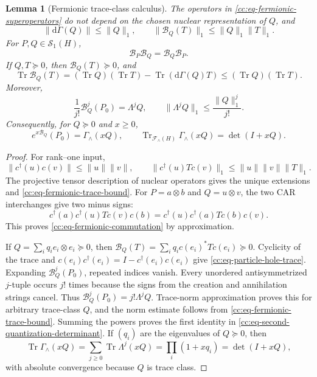 \documentclass[10pt,reqno]{amsart}
\theoremstyle{plain}
\newtheorem{lemma}[theorem]{Lemma}
\theoremstyle{definition}
\theoremstyle{remark}
\begin{document}
\begin{lemma}[Fermionic trace-class calculus]
\label{cc:lem-fermionic-calculus}
The operators in \eqref{cc:eq-fermionic-superoperators} do not depend on
the chosen nuclear representation of \(Q\), and
\begin{equation}
 \|\mathrm d\Gamma(Q)\|\leq\|Q\|_1,
 \qquad
 \|\mathcal B_Q(T)\|_1\leq\|Q\|_1\|T\|_1.
 \label{cc:eq-fermionic-trace-bound}
\end{equation}
For \(P,Q\in\mathcal S_1(H)\),
\begin{equation}
 \mathcal B_P\mathcal B_Q=\mathcal B_Q\mathcal B_P.
 \label{cc:eq-fermionic-commutation}
\end{equation}
If \(Q,T\succeq0\), then \(\mathcal B_Q(T)\succeq0\), and
\begin{equation}
 \operatorname{Tr}\mathcal B_Q(T)
 =(\operatorname{Tr}Q)(\operatorname{Tr}T)
  -\operatorname{Tr}(\mathrm d\Gamma(Q)T)
 \leq(\operatorname{Tr}Q)(\operatorname{Tr}T).
 \label{cc:eq-particle-hole-trace}
\end{equation}
Moreover,
\begin{equation}
 \frac1{j!}\mathcal B_Q^j(P_0)=\Lambda^jQ,
 \qquad
 \|\Lambda^jQ\|_1\leq\frac{\|Q\|_1^j}{j!}.
 \label{cc:eq-fermionic-powers}
\end{equation}
Consequently, for \(Q\succeq0\) and \(x\geq0\),
\begin{equation}
 e^{x\mathcal B_Q}(P_0)=\Gamma_{\wedge}(xQ),
 \qquad
 \operatorname{Tr}_{\mathcal F_{\wedge}(H)}\Gamma_{\wedge}(xQ)
 =\det(I+xQ).
 \label{cc:eq-second-quantization-determinant}
\end{equation}
\end{lemma}

\begin{proof}
For rank--one input,
\[
 \|c^{\dagger}(u)c(v)\|\leq\|u\|\|v\|,
 \qquad
 \|c^{\dagger}(u)Tc(v)\|_1
 \leq\|u\|\|v\|\|T\|_1.
\]
The projective tensor description of nuclear operators gives the unique
extensions and \eqref{cc:eq-fermionic-trace-bound}.  For
\(P=a\otimes b\) and \(Q=u\otimes v\), the two CAR interchanges give two
minus signs:
\[
 c^{\dagger}(a)c^{\dagger}(u)T c(v)c(b)
 =c^{\dagger}(u)c^{\dagger}(a)T c(b)c(v).
\]
This proves \eqref{cc:eq-fermionic-commutation} by approximation.

If \(Q=\sum_iq_i e_i\otimes e_i\succeq0\), then
\(
 \mathcal B_Q(T)=\sum_iq_i c(e_i)^*Tc(e_i)\succeq0
\).
Cyclicity of the trace and
\(c(e_i)c^{\dagger}(e_i)=I-c^{\dagger}(e_i)c(e_i)\) give
\eqref{cc:eq-particle-hole-trace}.  Expanding
\(\mathcal B_Q^j(P_0)\), repeated indices vanish.  Every unordered
antisymmetrized \(j\)-tuple occurs \(j!\) times because the signs from the
creation and annihilation strings cancel.  Thus
\(\mathcal B_Q^j(P_0)=j!\Lambda^jQ\).  Trace-norm approximation proves
this for arbitrary trace-class \(Q\), and the norm estimate follows from
\eqref{cc:eq-fermionic-trace-bound}.  Summing the powers proves the first
identity in \eqref{cc:eq-second-quantization-determinant}.  If
\((q_i)\) are the eigenvalues of \(Q\succeq0\), then
\[
 \operatorname{Tr}\Gamma_{\wedge}(xQ)
 =\sum_{j\geq0}\operatorname{Tr}\Lambda^j(xQ)
 =\prod_i(1+xq_i)=\det(I+xQ),
\]
with absolute convergence because \(Q\) is trace class.
\end{proof}
\end{document}
